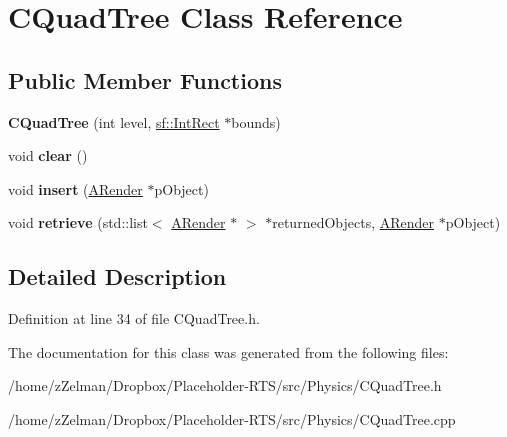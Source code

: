 \hypertarget{classCQuadTree}{\section{C\-Quad\-Tree Class Reference}
\label{classCQuadTree}
}
\subsection*{Public Member Functions}
\begin{DoxyCompactItemize}
\item 
\hypertarget{classCQuadTree_a508176d23f4bcb255ca06bf70edce638}{{\bfseries C\-Quad\-Tree} (int level, \hyperlink{classsf_1_1Rect}{sf\-::\-Int\-Rect} $\ast$bounds)}\label{classCQuadTree_a508176d23f4bcb255ca06bf70edce638}

\item 
\hypertarget{classCQuadTree_ab4cf0e58d782f7674eae21a1e56fa6d2}{void {\bfseries clear} ()}\label{classCQuadTree_ab4cf0e58d782f7674eae21a1e56fa6d2}

\item 
\hypertarget{classCQuadTree_af3c3b34432128c0e09f8d367a47ee505}{void {\bfseries insert} (\hyperlink{classARender}{A\-Render} $\ast$p\-Object)}\label{classCQuadTree_af3c3b34432128c0e09f8d367a47ee505}

\item 
\hypertarget{classCQuadTree_ad890e93429fccf89bee329ee75f10b3c}{void {\bfseries retrieve} (std\-::list$<$ \hyperlink{classARender}{A\-Render} $\ast$ $>$ $\ast$returned\-Objects, \hyperlink{classARender}{A\-Render} $\ast$p\-Object)}\label{classCQuadTree_ad890e93429fccf89bee329ee75f10b3c}

\end{DoxyCompactItemize}


\subsection{Detailed Description}


Definition at line 34 of file C\-Quad\-Tree.\-h.



The documentation for this class was generated from the following files\-:\begin{DoxyCompactItemize}
\item 
/home/z\-Zelman/\-Dropbox/\-Placeholder-\/\-R\-T\-S/src/\-Physics/C\-Quad\-Tree.\-h\item 
/home/z\-Zelman/\-Dropbox/\-Placeholder-\/\-R\-T\-S/src/\-Physics/C\-Quad\-Tree.\-cpp\end{DoxyCompactItemize}
